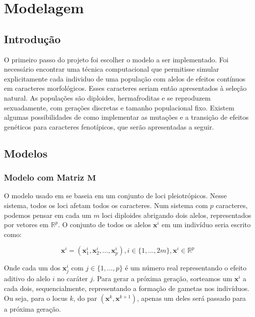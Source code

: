 \pagestyle{empty}
\cleardoublepage
\pagestyle{fancy}
\chapter{Modelagem}\label{cap2}

\section{Introdução}\label{cap2:intro}

O primeiro passo do projeto foi escolher o modelo a ser implementado.
Foi necessário encontrar uma técnica computacional que permitisse
simular explicitamente cada individuo de uma população com alelos de efeitos
contínuos em caracteres morfológicos.
Esses caracteres seriam então apresentados à seleção natural.
As populações são diploides, hermafroditas e se reproduzem sexuadamente,
com gerações discretas e tamanho populacional fixo.
Existem algumas possibilidades de como implementar as mutações e
a transição de efeitos genéticos para caracteres fenotípicos, que serão
apresentadas a seguir.

\section{Modelos}\label{cap2:mem}

\subsection{Modelo com Matriz $\mathbf{M}$}\label{cap2:mem:ModelM}

O modelo usado em \cite{Jones2003, Jones2004, Jones2007} se baseia em um
conjunto de loci pleiotrópicos.
Nesse sistema, todos os loci afetam todos os caracteres.
Num sistema com $p$ caracteres, podemos pensar em cada um $m$ loci
diploides abrigando dois alelos, representados por vetores em
$\mathbb{R}^p$.
O conjunto de todos os alelos $\mathbf{x}^i$ em um indivíduo seria
escrito como:

\begin{equation}
\mathbf{x}^i = ( \mathbf{x}^i_1, \mathbf{x}^i_2,\ldots, \mathbf{x}^i_p), i \in \{1,\ldots, 2m\}, \mathbf{x}^i \in \mathbb{R}^p
\end{equation}

Onde cada um dos $\mathbf{x}^i_j$ com $j \in \{1,\ldots, p\}$ é um número real
representando o efeito aditivo do alelo $i$ no caráter $j$.
Para gerar a próxima geração, sorteamos um $\mathbf{x}^i$ a cada dois,
sequencialmente, representando a formação de gametas nos indivíduos.
Ou seja, para o locus $k$, do par $(\mathbf{x}^{k},\mathbf{x}^{k+1})$,
apenas um deles será passado para a próxima geração.

